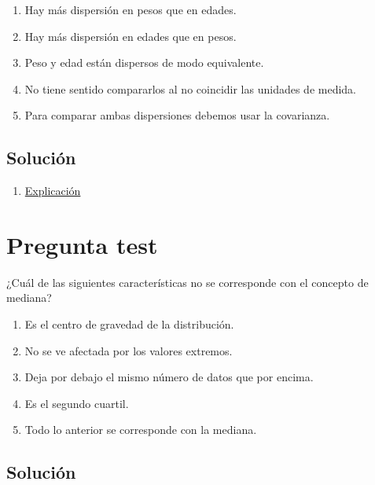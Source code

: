 \documentclass[
]{book}
\providecommand{\tightlist}{%
  \setlength{\itemsep}{0pt}\setlength{\parskip}{0pt}}
\begin{document}
\begin{enumerate}
\def\labelenumi{\alph{enumi})}
\tightlist
\item
  Hay más dispersión en pesos que en edades.
\item
  Hay más dispersión en edades que en pesos.
\item
  Peso y edad están dispersos de modo equivalente.
\item
  No tiene sentido compararlos al no coincidir las unidades de medida.
\item
  Para comparar ambas dispersiones debemos usar la covarianza.
\end{enumerate}

\hypertarget{soluciuxf3n-31}{%
\subsection{Solución}\label{soluciuxf3n-31}}

\begin{enumerate}
\def\labelenumi{\alph{enumi})}
\setcounter{enumi}{2}
\tightlist
\item
  \href{https://1fjmanzano.github.io/bioestadistica/medidas-de-posicio\%CC\%81n-dispersio\%CC\%81n-y-forma.html}{Explicación}
\end{enumerate}

\hypertarget{pregunta-test-30}{%
\section{Pregunta test}\label{pregunta-test-30}}

¿Cuál de las siguientes características no se corresponde con el concepto de mediana?

\begin{enumerate}
\def\labelenumi{\alph{enumi})}
\tightlist
\item
  Es el centro de gravedad de la distribución.
\item
  No se ve afectada por los valores extremos.
\item
  Deja por debajo el mismo número de datos que por encima.
\item
  Es el segundo cuartil.
\item
  Todo lo anterior se corresponde con la mediana.
\end{enumerate}

\hypertarget{soluciuxf3n-32}{%
\subsection{Solución}\label{soluciuxf3n-32}}
\end{document}
